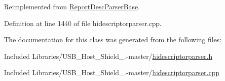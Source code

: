 \-Reimplemented from \hyperlink{class_report_desc_parser_base_ac1d6c015d9a2527bb2044e9a96fcaaf9}{\-Report\-Desc\-Parser\-Base}.



\-Definition at line 1440 of file hidescriptorparser.\-cpp.



\-The documentation for this class was generated from the following files\-:\begin{DoxyCompactItemize}
\item 
\-Included Libraries/\-U\-S\-B\-\_\-\-Host\-\_\-\-Shield\-\_.-\/master/\hyperlink{hidescriptorparser_8h}{hidescriptorparser.\-h}\item 
\-Included Libraries/\-U\-S\-B\-\_\-\-Host\-\_\-\-Shield\-\_.-\/master/\hyperlink{hidescriptorparser_8cpp}{hidescriptorparser.\-cpp}\end{DoxyCompactItemize}
